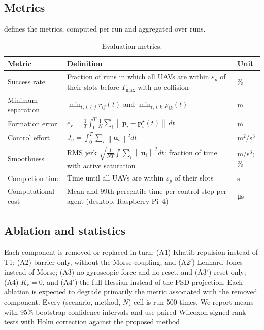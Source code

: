 \documentclass[11pt]{article}
\theoremstyle{definition}
\theoremstyle{remark}
\newcommand{\bp}{\mathbf{p}}
\newcommand{\bu}{\mathbf{u}}
\newcommand{\norm}[1]{\left\lVert #1 \right\rVert}
\begin{document}
\subsection{Metrics}
 defines the metrics, computed per run and aggregated over
runs.

\begin{table}[htbp]
\centering
\caption{Evaluation metrics.}\label{tab:metrics}
\small
\begin{tabular}{@{}l>{\raggedright}p{7.6cm}l@{}}
\toprule
Metric & Definition & Unit \\
\midrule
Success rate & Fraction of runs in which all UAVs are within $\varepsilon_p$ of their slots before $T_{\max}$ with no collision & \% \\
Minimum separation & $\min_{t,\,i\neq j} r_{ij}(t)$ and $\min_{t,\,i,k}\rho_{ik}(t)$ & m \\
Formation error & $e_F=\frac{1}{T}\int_0^T\frac1N\sum_i\norm{\bp_i-\bp_i^\star(t)}\,dt$ & m \\
Control effort & $J_u=\int_0^T\sum_i\norm{\bu_i}^2dt$ & m$^2$/s$^3$ \\
Smoothness & RMS jerk $\sqrt{\tfrac{1}{NT}\int\sum_i\norm{\dot{\bu}_i}^2dt}$; fraction of time with active saturation & m/s$^3$; \% \\
Completion time & Time until all UAVs are within $\varepsilon_p$ of their slots & s \\
Computational cost & Mean and 99th-percentile time per control step per agent (desktop, Raspberry Pi~4) & \si{\micro\second} \\
\bottomrule
\end{tabular}
\end{table}

\subsection{Ablation and statistics}
Each component is removed or replaced in turn: (A1) Khatib repulsion instead of
T1; (A2) barrier only, without the Morse coupling, and (A2$'$) Lennard-Jones
instead of Morse; (A3) no gyroscopic force and no reset, and (A3$'$) reset
only; (A4) $K_r=0$, and (A4$'$) the full Hessian instead of the PSD projection.
Each ablation is expected to degrade primarily the metric associated with the
removed component. Every (scenario, method, $N$) cell is run 500 times. We
report means with 95\% bootstrap confidence intervals and use paired Wilcoxon
signed-rank tests with Holm correction against the proposed method.
\end{document}
